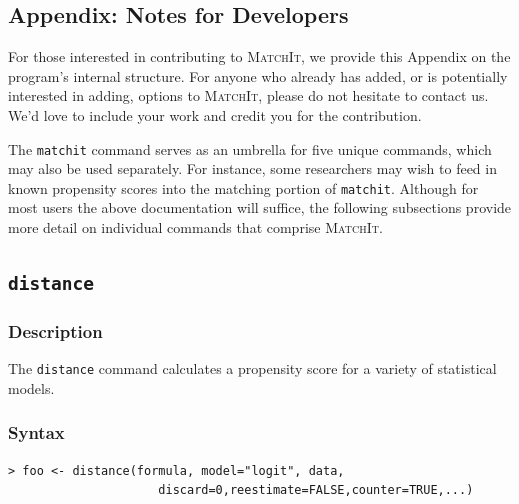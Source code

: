 \documentclass[oneside,letterpaper,titlepage]{article}
\newcommand{\MatchIt}{\textsc{MatchIt}}
\begin{document}
\begin{appendix}
\section{Appendix: Notes for Developers}
\label{reference}  
For those interested in contributing to \MatchIt, we provide this
Appendix on the program's internal structure.  For anyone who already
has added, or is potentially interested in adding, options to
\MatchIt, please do not hesitate to contact us.  We'd love to include
your work and credit you for the contribution.

The \texttt{matchit} command serves as an umbrella for five unique
commands, which may also be used separately.  For instance, some
researchers may wish to feed in known propensity scores into the
matching portion of \texttt{matchit}.  Although for most users the
above documentation will suffice, the following subsections provide
more detail on individual commands that comprise \MatchIt.

\subsection{\texttt{distance}}

\subsubsection{Description}
The \texttt{distance} command calculates a propensity score for a
variety of statistical models. 

\subsubsection{Syntax}
\begin{verbatim}
> foo <- distance(formula, model="logit", data,
                     discard=0,reestimate=FALSE,counter=TRUE,...)
\end{verbatim}


\end{appendix}
\end{document}
